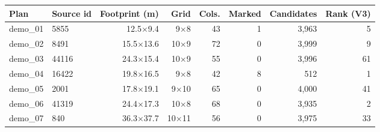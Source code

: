 \begin{tabular}{llrrrrrr}
\toprule
Plan & Source id & Footprint (m) & Grid & Cols. & Marked & Candidates & Rank (V3) \\
\midrule
demo\_01 & 5855 & 12.5$\times$9.4 & 9$\times$8 & 43 & 1 & 3,963 & 5 \\
demo\_02 & 8491 & 15.5$\times$13.6 & 10$\times$9 & 72 & 0 & 3,999 & 9 \\
demo\_03 & 44116 & 24.3$\times$15.4 & 10$\times$9 & 55 & 0 & 3,996 & 61 \\
demo\_04 & 16422 & 19.8$\times$16.5 & 9$\times$8 & 42 & 8 & 512 & 1 \\
demo\_05 & 2001 & 17.8$\times$19.1 & 9$\times$10 & 65 & 0 & 4,000 & 41 \\
demo\_06 & 41319 & 24.4$\times$17.3 & 10$\times$8 & 68 & 0 & 3,935 & 2 \\
demo\_07 & 840 & 36.3$\times$37.7 & 10$\times$11 & 56 & 0 & 3,975 & 33 \\
\bottomrule
\end{tabular}